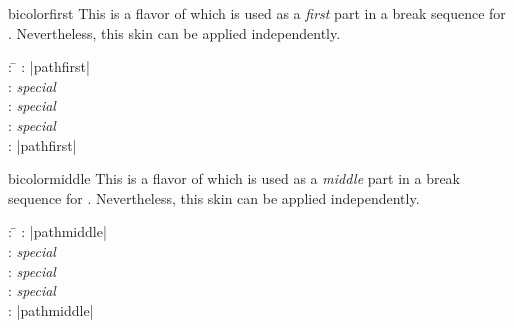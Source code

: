 \clearpage

\begin{docSkin}{bicolorfirst}
This is a flavor of  which is used as a \emph{first} part
in a break sequence for .
Nevertheless, this skin can be applied independently.
\begin{tcolorbox}[skintable=bicolorfirst]
  \begin{tabbing}
    : \=\kill
    :           \> |pathfirst|\\
    : \> \emph{special}\\ 
    :        \> \emph{special}\\
    :    \> \emph{special}\\
    :           \> |pathfirst|
  \end{tabbing}
\end{tcolorbox}
\end{docSkin}

\begin{dispExample}
\end{dispExample}


\clearpage

\begin{docSkin}{bicolormiddle}
This is a flavor of  which is used as a \emph{middle} part
in a break sequence for .
Nevertheless, this skin can be applied independently.
\begin{tcolorbox}[skintable=bicolormiddle]
  \begin{tabbing}
    : \=\kill
    :           \> |pathmiddle|\\
    : \> \emph{special}\\ 
    :        \> \emph{special}\\
    :    \> \emph{special}\\
    :           \> |pathmiddle|
  \end{tabbing}
\end{tcolorbox}
\end{docSkin}


\begin{dispExample}
\end{dispExample}


